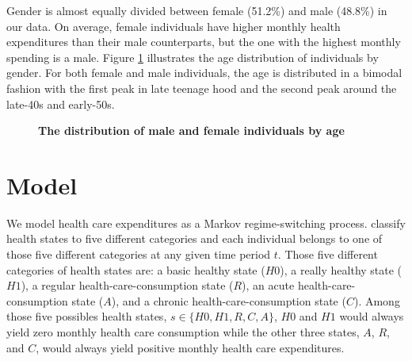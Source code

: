 \documentclass[letterpaper,12pt]{article}
\theoremstyle{definition}
\begin{document}
\begin{spacing}{1.5}{}
  Gender is almost equally divided between female (51.2\%) and male (48.8\%) in our data. On average, female individuals have higher monthly health expenditures than their male counterparts, but the one with the highest monthly spending is a male. Figure \ref{FigGenderAgeDist} illustrates the age distribution of individuals by gender. For both female and male individuals, the age is distributed in a bimodal fashion with the first peak in late teenage hood and the second peak around the late-40s and early-50s.\par

  \begin{figure}[h!]\centering \captionsetup{width=4.0in}
    \caption{\label{FigGenderAgeDist}\textbf{The distribution of male and female individuals by age}}
  \end{figure}
  
\section{Model}\label{SecModel}

    We model health care expenditures as a Markov regime-switching process. \citet{evans} classify health states to five different categories and each individual belongs to one of those five different categories at any given time period $t$. Those five different categories of health states are: a basic healthy state ($H0$), a really healthy state ($H1$), a regular health-care-consumption state ($R$), an acute health-care-consumption state ($A$), and a chronic health-care-consumption state ($C$). Among those five possibles health states, $s \in \{H0, H1, R, C, A\}$, $H0$ and $H1$ would always yield zero monthly health care consumption while the other three states, $A$, $R$, and $C$, would always yield positive monthly health care expenditures.
  

\end{spacing}
\end{document}
